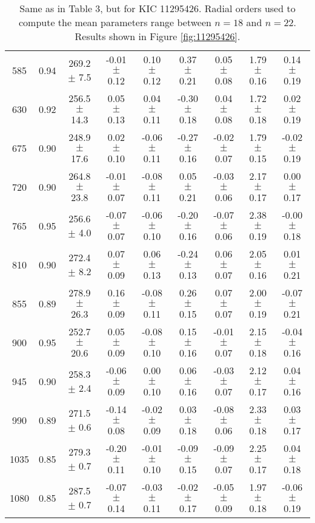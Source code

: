\documentclass[twocolumn]{aastex61}%
\begin{document}
\begin{table*}[ht]
\begin{tabular}{ccc|ccccc|c}
585 & 0.94 & 269.2 $\pm$ 7.5 & -0.01 $\pm$ 0.12 & 0.10 $\pm$ 0.12 & 0.37 $\pm$ 0.21 & 0.05 $\pm$ 0.08 & 1.79 $\pm$ 0.16 & 0.14 $\pm$ 0.19\\
630 & 0.92 & 256.5 $\pm$ 14.3 & 0.05 $\pm$ 0.13 & 0.04 $\pm$ 0.11 & -0.30 $\pm$ 0.18 & 0.04 $\pm$ 0.08 & 1.72 $\pm$ 0.18 & 0.02 $\pm$ 0.19\\
675 & 0.90 & 248.9 $\pm$ 17.6 & 0.02 $\pm$ 0.10 & -0.06 $\pm$ 0.11 & -0.27 $\pm$ 0.16 & -0.02 $\pm$ 0.07 & 1.79 $\pm$ 0.15 & -0.02 $\pm$ 0.19\\
720 & 0.90 & 264.8 $\pm$ 23.8 & -0.01 $\pm$ 0.07 & -0.08 $\pm$ 0.11 & 0.05 $\pm$ 0.21 & -0.03 $\pm$ 0.06 & 2.17 $\pm$ 0.17 & 0.00 $\pm$ 0.17\\
765 & 0.95 & 256.6 $\pm$ 4.0 & -0.07 $\pm$ 0.07 & -0.06 $\pm$ 0.10 & -0.20 $\pm$ 0.16 & -0.07 $\pm$ 0.06 & 2.38 $\pm$ 0.19 & -0.00 $\pm$ 0.18\\
810 & 0.90 & 272.4 $\pm$ 8.2 & 0.07 $\pm$ 0.09 & 0.06 $\pm$ 0.13 & -0.24 $\pm$ 0.13 & 0.06 $\pm$ 0.07 & 2.05 $\pm$ 0.16 & 0.01 $\pm$ 0.21\\
855 & 0.89 & 278.9 $\pm$ 26.3 & 0.16 $\pm$ 0.09 & -0.08 $\pm$ 0.11 & 0.26 $\pm$ 0.15 & 0.07 $\pm$ 0.07 & 2.00 $\pm$ 0.19 & -0.07 $\pm$ 0.21\\
900 & 0.95 & 252.7 $\pm$ 20.6 & 0.05 $\pm$ 0.09 & -0.08 $\pm$ 0.10 & 0.15 $\pm$ 0.16 & -0.01 $\pm$ 0.07 & 2.15 $\pm$ 0.18 & -0.04 $\pm$ 0.16\\
945 & 0.90 & 258.3 $\pm$ 2.4 & -0.06 $\pm$ 0.09 & 0.00 $\pm$ 0.10 & 0.06 $\pm$ 0.16 & -0.03 $\pm$ 0.07 & 2.12 $\pm$ 0.17 & 0.04 $\pm$ 0.16\\
990 & 0.89 & 271.5 $\pm$ 0.6 & -0.14 $\pm$ 0.08 & -0.02 $\pm$ 0.09 & 0.03 $\pm$ 0.18 & -0.08 $\pm$ 0.06 & 2.33 $\pm$ 0.18 & 0.03 $\pm$ 0.17\\
1035 & 0.85 & 279.3 $\pm$ 0.7 & -0.20 $\pm$ 0.11 & -0.01 $\pm$ 0.10 & -0.09 $\pm$ 0.15 & -0.09 $\pm$ 0.07 & 2.25 $\pm$ 0.17 & 0.04 $\pm$ 0.18\\
1080 & 0.85 & 287.5 $\pm$ 0.7 & -0.07 $\pm$ 0.14 & -0.03 $\pm$ 0.11 & -0.02 $\pm$ 0.17 & -0.05 $\pm$ 0.09 & 1.97 $\pm$ 0.18 & -0.06 $\pm$ 0.19\\
\end{tabular}
\caption{Same as in Table 3, but for KIC 11295426. Radial orders used to compute the mean parameters range between $n=18$ and $n=22$. Results shown in Figure \ref{fig:11295426}.}\label{tab:11295426}
\end{table*}
\end{document}
